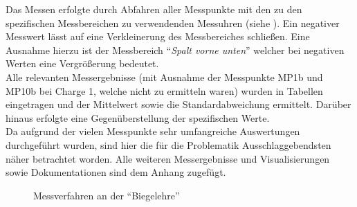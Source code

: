 \documentclass[12pt,a4paper,parskip]{scrartcl}
\begin{document}
 
Das Messen erfolgte durch Abfahren aller Messpunkte mit den zu den spezifischen Messbereichen zu verwendenden Messuhren (siehe ). Ein negativer Messwert lässt auf eine Verkleinerung des Messbereiches schließen. Eine Ausnahme hierzu ist der Messbereich "`\emph{Spalt vorne unten}"' welcher  bei negativen Werten eine Vergrößerung bedeutet.\\
 Alle relevanten Messergebnisse (mit Ausnahme der Messpunkte MP1b und MP10b bei Charge 1, welche nicht zu ermitteln waren) wurden in Tabellen eingetragen und  der Mittelwert sowie die Standardabweichung
 ermittelt. Darüber hinaus erfolgte eine Gegenüberstellung der spezifischen Werte.\\
Da aufgrund der vielen Messpunkte  sehr umfangreiche Auswertungen durchgeführt wurden,  sind hier die für die Problematik Ausschlaggebendsten näher betrachtet worden. Alle weiteren Messergebnisse und Visualisierungen sowie Dokumentationen sind dem Anhang zugefügt. 
\begin{figure}[!htb]
\centering
\hfill
{}
\hfill
{}
\hfill
\caption{Messverfahren an der "`Biegelehre"' }
\label{fig:messverfahren}
\end{figure}
\end{document}
